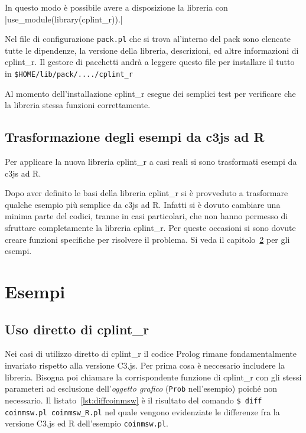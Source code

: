 \documentclass[10pt,titlepage,twoside,a4paper]{report}
\begin{document}
In questo modo è possibile avere a disposizione la libreria con 
|use_module(library(cplint_r)).|

Nel file di configurazione \texttt{pack.pl} che si trova al'interno del pack 
sono elencate tutte le dipendenze, la versione della libreria, descrizioni, 
ed altre informazioni di cplint\_r. Il gestore di pacchetti andrà a leggere 
questo file per installare il tutto in \texttt{\$HOME/lib/pack/..../cplint\_r}

Al momento dell'installazione cplint\_r esegue dei semplici 
test per verificare che la libreria stessa funzioni correttamente.


\section{Trasformazione degli esempi da c3js ad R} \label{sec:trasformazione-
degli-esempi-da-c3js-ad-r}
Per applicare la nuova libreria cplint\_r a casi reali si sono trasformati 
esempi da c3js ad R.

Dopo aver definito le basi della libreria cplint\_r si è provveduto a 
trasformare qualche esempio più semplice da c3js ad R. Infatti si è 
dovuto cambiare una minima parte del codici, tranne in casi particolari, che 
non hanno permesso di sfruttare completamente la 
libreria cplint\_r. Per queste occasioni si sono dovute creare funzioni 
specifiche per risolvere il problema. Si veda il capitolo~\ref{ch:esempi} per 
gli esempi.




\chapter{Esempi}
\label{ch:esempi}

\section{Uso diretto di cplint\_r}
Nei casi di utilizzo diretto di cplint\_r il codice Prolog rimane 
fondamentalmente invariato rispetto alla  versione C3.js. Per prima cosa è 
neccesario includere la libreria. Bisogna poi chiamare la corrispondente 
funzione di cplint\_r con gli stessi parameteri ad esclusione 
dell'\emph{oggetto grafico} (\texttt{Prob} nell'esempio) poiché non 
necessario. Il listato~\ref{lst:diffcoinmsw} è il risultato del comando
\texttt{\$ diff coinmsw.pl coinmsw\_R.pl}
nel quale vengono evidenziate le differenze fra la versione C3.js 
\cite{coinmswpl} ed R \cite{coinmswrpl} dell'esempio \texttt{coinmsw.pl}.
\end{document}
